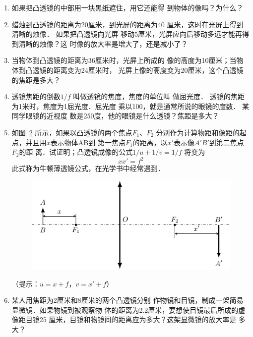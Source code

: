 \begin{enumerate}
\begin{figure}[htbp]
    \caption{}\label{fig_C_5-59}
\end{figure}
\item 如果把凸透镜的中部用一块黑纸遮住，用它还能得
到物体的像吗？为什么？
\item 蜡烛到凸透镜的距离为20厘米，到光屏的距离为40
厘米，这时在光屏上得到清晰的烛像．
如果把凸透镜向光屏
移动5厘米，光屏应向后移动多远才能再得到清晰的烛像？这
时像的放大率是增大了，还是减小了？
\item 当物体到凸透镜的距离为36厘米时，光屏上所成的
像的高度为10厘米；当物体到凸透镜的距离变为24厘米时，
光屏上像的高度变为20厘米，这个凸透镜的焦距是多大？
\item 透镜焦距的倒数$1/f$
叫做透镜的焦度，焦度的单位叫
做屈光度．
透镜的焦距为1米时，焦度为1屈光度．屈光度
乘以100，就是通常所说的眼镜的度数．
某同学眼镜的近视度
数是250度，他的眼镜是什么透镜？焦距是多大？
\item 如图~\ref{fig_C_5-60} 所示，如果以凸透镜的两个焦点$F_1$、$F_2$
分别作为计算物距和像距的起点，并且用$x$表示物体AB到
第一焦点$F_1$的距离，以$x'$表示像$A'B'$到第二焦点$F_2$的距
离．试证明；凸透镜成像的公式$1/u+1/v=1/f$
将变为
\[
xx'=f^2
\]
此式称为牛顿薄透镜公式，在光学书中经常遇到．
\begin{figure}[htbp]
    \centering
    \includegraphics{fig/C/5-60.pdf}
    \caption{}\label{fig_C_5-60}
\end{figure}
（提示：$u=x+f$，$v=x'+f$）
\item 某人用焦距为2厘米和8厘米的两个凸透镜分别
作物镜和目镜，制成一架简易显微镜．如果物镜到被观察物
体的距离为2.2厘米，要想使目镜最后所成的虚像距目镜25
厘米，目镜和物镜间的距离应为多大？这架显微镜的放大率是
多大？
\end{enumerate}


